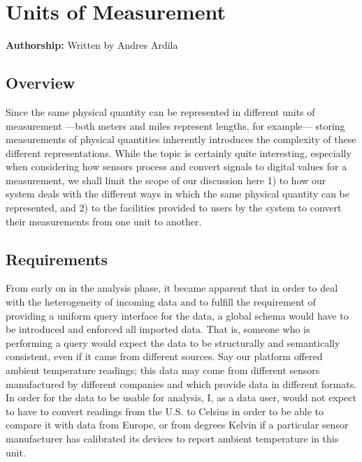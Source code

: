\section{Units of Measurement}\label{sec:units}

\vspace{8 pt}
\textbf{Authorship:} Written by Andres Ardila
\vspace{10 pt}


\subsection{Overview}\label{overview}

Since the same physical quantity can be represented in different units
of measurement ---both meters and miles represent lengths, for
example--- storing measurements of physical quantities inherently
introduces the complexity of these different representations. While the
topic is certainly quite interesting, especially when considering how
sensors process and convert signals to digital values for a measurement,
we shall limit the scope of our discussion here 1) to how our system
deals with the different ways in which the same physical quantity can be
represented, and 2) to the facilities provided to users by the system to
convert their measurements from one unit to another.

\subsection{Requirements}\label{requirements}

From early on in the analysis phase, it became apparent that in order to
deal with the heterogeneity of incoming data and to fulfill the
requirement of providing a uniform query interface for the data, a
global schema would have to be introduced and enforced all imported
data. That is, someone who is performing a query would expect the data
to be structurally and semantically consistent, even if it came from
different sources. Say our platform offered ambient temperature
readings; this data may come from different sensors manufactured by
different companies and which provide data in different formats. In
order for the data to be usable for analysis, I, as a data user, would
not expect to have to convert readings from the U.S. to Celsius in order
to be able to compare it with data from Europe, or from degrees Kelvin
if a particular sensor manufacturer has calibrated its devices to report
ambient temperature in this unit.

